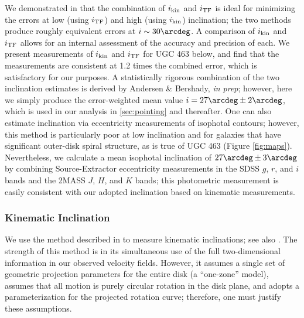 \documentclass[apj,iop,numberedappendix]{emulateapj}
\begin{document}
We demonstrated in  that the combination of
$i_{\rm kin}$ and $i_{\rm TF}$ is ideal for minimizing the errors at low (using $i_{\rm TF}$) and
high (using $i_{\rm kin}$) inclination; the two methods produce roughly equivalent
errors at $i \sim 30\arcdeg$.  A comparison of $i_{\rm kin}$ and $i_{\rm TF}$ allows for an
internal assessment of the accuracy and precision of each.  We present
measurements of $i_{\rm kin}$ and $i_{\rm TF}$ for UGC 463 below, and find that the
measurements are consistent at 1.2 times the combined error, which is
satisfactory for our purposes.  A statistically rigorous combination of the two
inclination estimates is derived by Andersen \& Bershady, {\it in prep};
however, here we simply produce the error-weighted mean value $i =
27\arcdeg\pm2\arcdeg$, which is used in our analysis in \sect \ref{sec:pointing}
and thereafter.  One can also estimate inclination via eccentricity measurements
of isophotal contours; however, this method is particularly poor at low
inclination and for galaxies that have significant outer-disk spiral structure,
as is true of UGC 463 (Figure \ref{fig:maps}).  Nevertheless, we calculate a
mean isophotal inclination of $27\arcdeg\pm 3\arcdeg$ by combining
Source-Extractor eccentricity measurements in the SDSS $g$, $r$, and $i$ bands
and the 2MASS $J$, $H$, and $K$ bands; this photometric measurement is easily
consistent with our adopted inclination based on kinematic measurements.

\subsubsection{Kinematic Inclination}
\label{sec:ikin}

We use the method described in \citet{2008ApJ...688..990A} to measure kinematic
inclinations; see also \citet{2003ApJ...599L..79A}.  The strength of this method
is in its simultaneous use of the full two-dimensional information in our
observed velocity fields.  However, it assumes a single set of geometric
projection parameters for the entire disk (a ``one-zone'' model), assumes that
all motion is purely circular rotation in the disk plane, and adopts a
parameterization for the projected rotation curve; therefore, one must justify
these assumptions.
\end{document}
